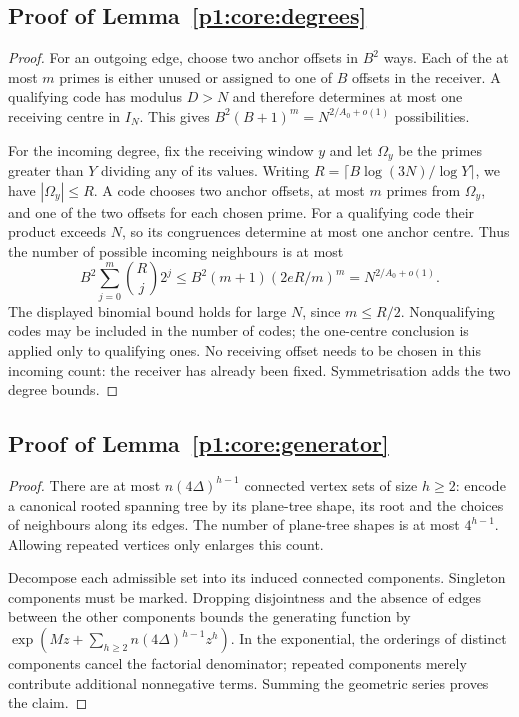 \subsection{Proof of Lemma~\ref{p1:core:degrees}}
\label{p14:comp:certificate-degrees}

\begin{proof}
For an outgoing edge, choose two anchor offsets in $B^2$ ways. Each of
the at most $m$ primes is either unused or assigned to one of $B$
offsets in the receiver. A qualifying code has modulus $D>N$ and
therefore determines at most one receiving centre in $I_N$. This gives
$B^2(B+1)^m=N^{2/A_0+o(1)}$ possibilities.

For the incoming degree, fix the receiving window $y$ and let
$\Omega_y$ be the primes greater than $Y$ dividing any of its values.
Writing $R=\lceil B\log(3N)/\log Y\rceil$, we have $|\Omega_y|\le R$.
A code chooses two anchor offsets, at most $m$ primes from $\Omega_y$,
and one of the two offsets for each chosen prime. For a qualifying
code their product exceeds $N$, so its congruences determine at most
one anchor centre. Thus the number of possible incoming neighbours is
at most
\[
 B^2\sum_{j=0}^m\binom Rj2^j
 \le B^2(m+1)(2eR/m)^m
 =N^{2/A_0+o(1)}.
\]
The displayed binomial bound holds for large $N$, since $m\le R/2$.
Nonqualifying codes may be included in the number of codes; the
one-centre conclusion is applied only to qualifying ones. No receiving
offset needs to be chosen in this incoming count: the receiver has
already been fixed. Symmetrisation adds the two degree bounds.
\end{proof}

\subsection{Proof of Lemma~\ref{p1:core:generator}}
\label{p14:comp:certificate-generator}

\begin{proof}
There are at most $n(4\Delta)^{h-1}$ connected vertex sets of size
$h\ge2$: encode a canonical rooted spanning tree by its plane-tree
shape, its root and the choices of neighbours along its edges. The
number of plane-tree shapes is at most $4^{h-1}$. Allowing repeated
vertices only enlarges this count.

Decompose each admissible set into its induced connected components.
Singleton components must be marked. Dropping disjointness and the
absence of edges between the other components bounds the generating
function by
$\exp(Mz+\sum_{h\ge2}n(4\Delta)^{h-1}z^h)$.
In the exponential, the orderings of distinct components cancel the
factorial denominator; repeated components merely contribute additional
nonnegative terms. Summing the geometric series proves the claim.
\end{proof}
